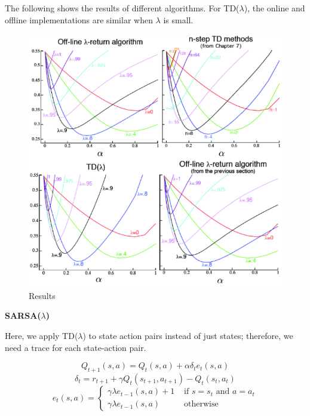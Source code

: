 \documentclass{article}
\begin{document}
\noindent
The following shows the results of different algorithms. For TD($\lambda$), the
online and offline implementations are similar when $\lambda$ is small.

\begin{figure}[h]
\includegraphics[scale=0.45]{results}
\centering
\caption{Results}
\end{figure}

\newpage
\noindent
\textbf{SARSA($\lambda$)}

\noindent
Here, we apply TD($\lambda$) to state action pairs instead of just states;
therefore, we need a trace for each state-action pair.

\begin{equation}
Q_{t+1}(s, a)=Q_{t}(s, a)+\alpha \delta_{t} e_{t}(s, a)
\end{equation}
\begin{equation}
\delta_{t}=r_{t+1}+\gamma Q_{t}\left(s_{t+1}, a_{t+1}\right)-Q_{t}\left(s_{t}, a_{t}\right)
\end{equation}
\begin{equation}
e_{t}(s, a)=\left\{\begin{array}{ll}
\gamma \lambda e_{t-1}(s, a)+1 & \text { if } s=s_{t} \text { and } a=a_{t} \\
\gamma \lambda e_{t-1}(s, a) & \text { otherwise }
\end{array}\right.
\end{equation}
\end{document}
